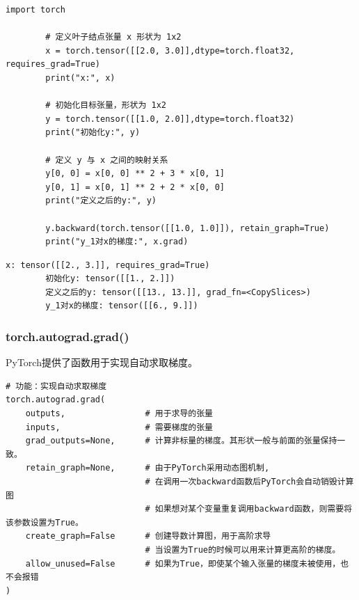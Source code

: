\begin{enumerate}[label=\arabic*)]
        \begin{lstlisting}[style=pythonstyle]
        import torch

        # 定义叶子结点张量 x 形状为 1x2
        x = torch.tensor([[2.0, 3.0]],dtype=torch.float32, requires_grad=True)
        print("x:", x)
        
        # 初始化目标张量，形状为 1x2
        y = torch.tensor([[1.0, 2.0]],dtype=torch.float32)
        print("初始化y:", y)
        
        # 定义 y 与 x 之间的映射关系
        y[0, 0] = x[0, 0] ** 2 + 3 * x[0, 1]
        y[0, 1] = x[0, 1] ** 2 + 2 * x[0, 0]
        print("定义之后的y:", y)
        
        y.backward(torch.tensor([[1.0, 1.0]]), retain_graph=True)
        print("y_1对x的梯度:", x.grad)
        \end{lstlisting}
        \begin{lstlisting}[style=demostyle,numbers=none]
        x: tensor([[2., 3.]], requires_grad=True)
        初始化y: tensor([[1., 2.]])
        定义之后的y: tensor([[13., 13.]], grad_fn=<CopySlices>)
        y_1对x的梯度: tensor([[6., 9.]])
        \end{lstlisting}
\end{enumerate}




\subsubsection{torch.autograd.grad()}
\label{subsubsec:Pytorch的torch.autograd.grad()}
PyTorch提供了函数用于实现自动求取梯度。

\begin{lstlisting}[style=demostyle, numbers=none]
# 功能：实现自动求取梯度
torch.autograd.grad(
    outputs,                # 用于求导的张量
    inputs,                 # 需要梯度的张量
    grad_outputs=None,      # 计算非标量的梯度。其形状一般与前面的张量保持一致。
    retain_graph=None,      # 由于PyTorch采用动态图机制,
                            # 在调用一次backward函数后PyTorch会自动销毁计算图
                            # 如果想对某个变量重复调用backward函数，则需要将该参数设置为True。
    create_graph=False      # 创建导数计算图，用于高阶求导
                            # 当设置为True的时候可以用来计算更高阶的梯度。
    allow_unused=False      # 如果为True，即使某个输入张量的梯度未被使用，也不会报错
)  
\end{lstlisting}

